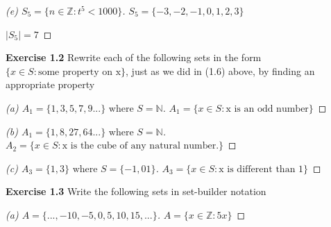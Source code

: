 \documentclass[12pt,oneside]{article}
\newenvironment{exercise}[1]{\vspace{.1in}\noindent\textbf{Exercise #1 \hspace{.05em}}}{}
\newcommand{\Z}{\mathbb{Z}}
\newcommand{\N}{\mathbb{N}}
\begin{document}
\begin{proof}[(e) $S_5 = \{n \in \Z : t^5 < 1000\}$]

\item$S_5 = \{-3,-2,-1, 0,1,2,3\}$
\item $|S_5| = 7$

\end{proof}





\begin{exercise}{1.2}
Rewrite each of the following sets in the form
$\{x \in S : \text{some property on x}\}$,
just as we did in (1.6) above, by finding an appropriate property


\end{exercise}

\begin{proof}[(a) $A_1 = \{1, 3, 5, 7, 9 ...\} \text{ where } S = \N$]

\item$A_1 = \{x \in S: \text{x is an odd number}\}$

\end{proof}

\begin{proof}[(b) $A_1 = \{1, 8, 27, 64 ...\} \text{ where } S = \N$]

\item$A_2 = \{x \in S: \text{x is the cube of any natural number.}\}$

\end{proof}

\begin{proof}[(c) $A_3 = \{1, 3\} \text{ where } S = \{-1, 0 1\}$]

\item$A_3 = \{x\in S: \text{x is different than 1}\}$

\end{proof}


\begin{exercise}{1.3}
Write the following sets in set-builder notation

\end{exercise}

\begin{proof}[(a) $A = \{..., -10, -5, 0, 5, 10, 15, ...\}$]

\item$A = \{x \in \Z: 5x \}$

\end{proof}
\end{document}
